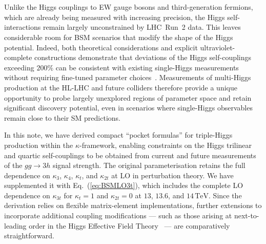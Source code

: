 \documentclass{SciPost}
\begin{document}
\FloatBarrier

\section{\textbf{}}
\label{sec:conclusions}

Unlike the Higgs couplings to EW gauge bosons and third-generation fermions, which are already being measured with increasing precision, the Higgs self-interactions remain largely unconstrained by LHC~Run~2 data. This leaves considerable room for BSM scenarios that modify the shape of the Higgs potential. Indeed, both theoretical considerations and explicit ultraviolet-complete constructions demonstrate that deviations of the Higgs self-couplings exceeding $200\%$ can be consistent with existing single-Higgs measurements without requiring fine-tuned parameter choices~\cite{Durieux:2022hbu}. Measurements of multi-Higgs production at the HL-LHC and future colliders therefore provide a unique opportunity to probe largely unexplored regions of parameter space and retain significant discovery potential, even in scenarios where single-Higgs observables remain close to their SM predictions.

In this note, we have derived compact ``pocket formulas'' for triple-Higgs production within the $\kappa$-framework, enabling constraints on the Higgs trilinear and quartic self-couplings to be obtained from current and future measurements of the $gg \to 3h$ signal strength. The original parameterisation retains the full dependence on $\kappa_3$, $\kappa_4$, $\kappa_t$, and $\kappa_{2t}$ at LO in perturbation theory. We have supplemented it with Eq.~(\ref{eq:BSMLO3t}), which includes the complete LO dependence on $\kappa_{3t}$ for $\kappa_t=1$ and $\kappa_{2t}=0$ at $13$, $13.6$, and $14\,\mathrm{TeV}$. Since the derivation relies on flexible matrix-element implementations, further extensions to incorporate additional coupling modifications --- such as those arising at next-to-leading order in the Higgs Effective Field Theory~\cite{Brivio:2025sib} --- are comparatively straightforward.
\end{document}
